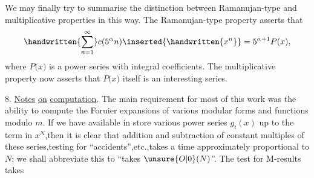 We may finally try to summarise the distinction between Ramanujan-type and multiplicative properties in this way. The Ramanujan-type property asserts that
\[
\handwritten{\sum_{n=1}^{\infty}}c(5^{\alpha}n)\inserted{\handwritten{x^{n}}}=5^{\alpha+1}P(x),
\]
where \uline{$P(x$}$)$ is a power series with integral coefficients. The multiplicative property now asserts that \uline{$P(x$}$)$ itself is an interesting series.

8. \uline{Notes} \uline{on} \uline{computation}. The main requirement for most of this work was the ability to compute the Foruier expansions of various modular forms and functions modulo \uline{$m$}. If we have available in store various power series $g_{i}(x)$ up to the term in $x^{N}$,then it is clear that addition and subtraction of constant multiples of these series,testing for ``accidents'',etc.,takes a time approximately proportional to $N$; we shall abbreviate this to ``takes $\unsure{O|0}(N)$''. The test for M-results takes
\normalmarginpar
